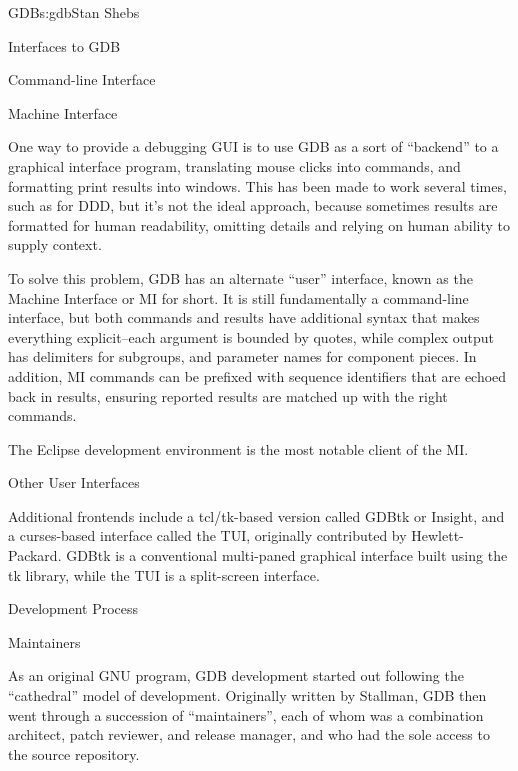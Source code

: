 \begin{aosachapter}{GDB}{s:gdb}{Stan Shebs}
\begin{aosasect1}{Interfaces to GDB}
\begin{aosasect2}{Command-line Interface}
\end{aosasect2}

\begin{aosasect2}{Machine Interface}

One way to provide a debugging GUI is to use GDB as a sort of
``backend'' to a graphical interface program, translating mouse clicks
into commands, and formatting print results into windows.  This has
been made to work several times, such as for DDD, but it's not the
ideal approach, because sometimes results are formatted for human
readability, omitting details and relying on human ability to supply
context.

To solve this problem, GDB has an alternate ``user'' interface, known
as the Machine Interface or MI for short.  It is still fundamentally a
command-line interface, but both commands and results have additional
syntax that makes everything explicit--each argument is bounded by
quotes, while complex output has delimiters for subgroups, and
parameter names for component pieces.  In addition, MI commands can be
prefixed with sequence identifiers that are echoed back in results,
ensuring reported results are matched up with the right commands.


The Eclipse development environment is the most notable client of the
MI.

\end{aosasect2}

\begin{aosasect2}{Other User Interfaces}

Additional frontends include a tcl/tk-based version called GDBtk or
Insight, and a curses-based interface called the TUI, originally
contributed by Hewlett-Packard.  GDBtk is a conventional multi-paned
graphical interface built using the tk library, while the TUI is a
split-screen interface.

\end{aosasect2}

\end{aosasect1}

\begin{aosasect1}{Development Process}

\begin{aosasect2}{Maintainers}

As an original GNU program, GDB development started out following the
``cathedral'' model of development.  Originally written by Stallman,
GDB then went through a succession of ``maintainers'', each of whom
was a combination architect, patch reviewer, and release manager, and
who had the sole access to the source repository.


\end{aosasect2}
\end{aosasect1}
\end{aosachapter}
